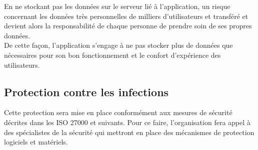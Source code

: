 En ne stockant pas les données sur le serveur lié à l'application, un risque concernant les données très personnelles de milliers d'utilisateurs et transféré et devient alors la responsabilité de chaque personne de prendre soin de ses propres données.\\

De cette façon, l'application s'engage à ne pas stocker plus de données que nécessaires pour son bon fonctionnement et le confort d'expérience des utilisateurs.

\subsection*{Protection contre les infections}
Cette protection sera mise en place conformément aux mesures de sécurité décrites dans les ISO 27000 et suivants. Pour ce faire, l'organisation fera appel à des spécialistes de la sécurité qui mettront en place des mécanismes de protection logiciels et matériels.